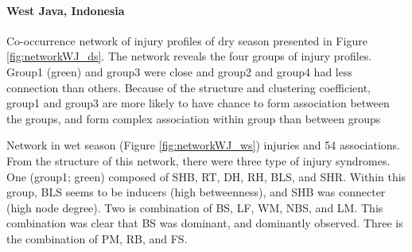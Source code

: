 \paragraph{West Java, Indonesia}

Co-occurrence network of injury profiles of dry season presented in Figure \ref{fig:networkWJ_ds}. The network reveals the four groups of injury profiles. Group1 (green) and group3 were close and group2 and group4 had less connection than others. Because of the structure and clustering coefficient, group1 and group3 are more likely to have chance to form association between the groups, and form complex association within group than between groups

Network in wet season (Figure \ref{fig:networkWJ_ws}) injuries and 54 associations. From the structure of this network, there were three type of injury syndromes.  One (group1; green) composed of SHB, RT, DH, RH, BLS, and SHR.  Within this group, BLS seems to be inducers (high betweenness), and SHB was connecter (high node degree). Two is combination of BS, LF, WM, NBS, and LM. This combination was clear that BS was dominant, and dominantly observed. Three is the combination of PM, RB, and FS. 

